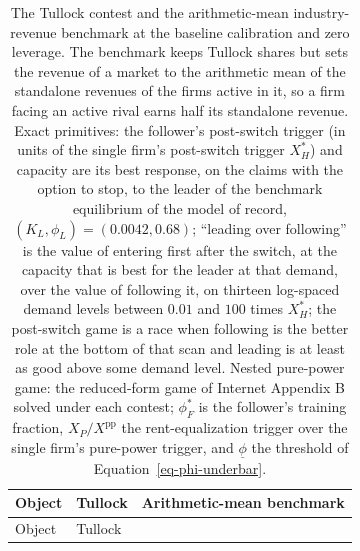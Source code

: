 \documentclass[
  11pt,
  letterpaper,
]{scrartcl}
\begin{document}
\begin{longtable}[]{@{}
  >{\raggedright\arraybackslash}p{}
  >{\centering\arraybackslash}p{}
  >{\centering\arraybackslash}p{}@{}}
\caption{The Tullock contest and the arithmetic-mean industry-revenue
benchmark at the baseline calibration and zero leverage. The benchmark
keeps Tullock shares but sets the revenue of a market to the arithmetic
mean of the standalone revenues of the firms active in it, so a firm
facing an active rival earns half its standalone revenue. Exact
primitives: the follower's post-switch trigger (in units of the single
firm's post-switch trigger \(X_H^*\)) and capacity are its best
response, on the claims with the option to stop, to the leader of the
benchmark equilibrium of the model of record,
\((K_L, \phi_L) = (0.0042, 0.68)\); ``leading over following'' is the
value of entering first after the switch, at the capacity that is best
for the leader at that demand, over the value of following it, on
thirteen log-spaced demand levels between \(0.01\) and \(100\) times
\(X_H^*\); the post-switch game is a race when following is the better
role at the bottom of that scan and leading is at least as good above
some demand level. Nested pure-power game: the reduced-form game of
Internet Appendix B solved under each contest; \(\phi_F^*\) is the
follower's training fraction, \(X_P/X^{\text{pp}}\) the
rent-equalization trigger over the single firm's pure-power trigger, and
\(\underline{\phi}\) the threshold of
Equation~\ref{eq-phi-underbar}.}\label{tbl-fixedpie}\tabularnewline
\toprule\noalign{}
\begin{minipage}[b]{\linewidth}\raggedright
Object
\end{minipage} & \begin{minipage}[b]{\linewidth}\centering
Tullock
\end{minipage} & \begin{minipage}[b]{\linewidth}\centering
Arithmetic-mean benchmark
\end{minipage} \\
\midrule\noalign{}
\endfirsthead
\toprule\noalign{}
\begin{minipage}[b]{\linewidth}\raggedright
Object
\end{minipage} & \begin{minipage}[b]{\linewidth}\centering
Tullock
\end{minipage} & \begin{minipage}[b]{\linewidth}\centering

\end{minipage}
\end{longtable}
\end{document}
